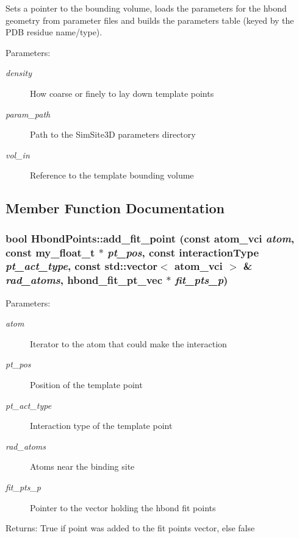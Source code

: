 Sets a pointer to the bounding volume, loads the parameters for the hbond geometry from parameter files and builds the parameters table (keyed by the PDB residue name/type).

\begin{Desc}
\item[Parameters:]
\begin{description}
\item[{\em density}]How coarse or finely to lay down template points \item[{\em param\_\-path}]Path to the SimSite3D parameters directory \item[{\em vol\_\-in}]Reference to the template bounding volume \end{description}
\end{Desc}


\subsection{Member Function Documentation}
\subsubsection{\setlength{\rightskip}{0pt plus 5cm}bool Hbond\-Points::add\_\-fit\_\-point (const atom\_\-vci {\em atom}, const my\_\-float\_\-t $\ast$ {\em pt\_\-pos}, const interaction\-Type {\em pt\_\-act\_\-type}, const std::vector$<$ atom\_\-vci $>$ \& {\em rad\_\-atoms}, \bf{hbond\_\-fit\_\-pt\_\-vec} $\ast$ {\em fit\_\-pts\_\-p})\hspace{0.3cm}{\tt  [private]}}\label{classSimSite3D_1_1HbondPoints_14615a8c95ec86228c24de2b96dab9eb}


\begin{Desc}
\item[Parameters:]
\begin{description}
\item[{\em atom}]Iterator to the atom that could make the interaction \item[{\em pt\_\-pos}]Position of the template point \item[{\em pt\_\-act\_\-type}]Interaction type of the template point \item[{\em rad\_\-atoms}]Atoms near the binding site \item[{\em fit\_\-pts\_\-p}]Pointer to the vector holding the hbond fit points \end{description}
\end{Desc}
\begin{Desc}
\item[Returns:]True if point was added to the fit points vector, else false \end{Desc}
